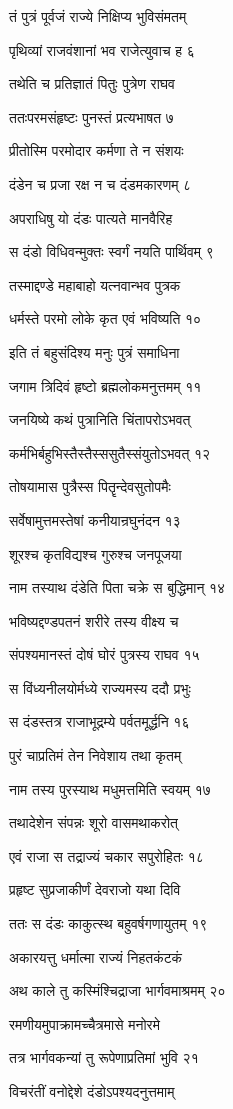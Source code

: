 तं पुत्रं पूर्वजं राज्ये निक्षिप्य भुविसंमतम्

पृथिव्यां राजवंशानां भव राजेत्युवाच ह ६

तथेति च प्रतिज्ञातं पितुः पुत्रेण राघव

ततःपरमसंहृष्टः पुनस्तं प्रत्यभाषत ७

प्रीतोस्मि परमोदार कर्मणा ते न संशयः

दंडेन च प्रजा रक्ष न च दंडमकारणम् ८

अपराधिषु यो दंडः पात्यते मानवैरिह

स दंडो विधिवन्मुक्तः स्वर्गं नयति पार्थिवम् ९

तस्माद्दण्डे महाबाहो यत्नवान्भव पुत्रक

धर्मस्ते परमो लोके कृत एवं भविष्यति १०

इति तं बहुसंदिश्य मनुः पुत्रं समाधिना

जगाम त्रिदिवं हृष्टो ब्रह्मलोकमनुत्तमम् ११

जनयिष्ये कथं पुत्रानिति चिंतापरोऽभवत्

कर्मभिर्बहुभिस्तैस्तैस्ससुतैस्संयुतोऽभवत् १२

तोषयामास पुत्रैस्स पितॄन्देवसुतोपमैः

सर्वेषामुत्तमस्तेषां कनीयान्रघुनंदन १३

शूरश्च कृतविद्यश्च गुरुश्च जनपूजया

नाम तस्याथ दंडेति पिता चक्रे स बुद्धिमान् १४

भविष्यद्दण्डपतनं शरीरे तस्य वीक्ष्य च

संपश्यमानस्तं दोषं घोरं पुत्रस्य राघव १५

स विंध्यनीलयोर्मध्ये राज्यमस्य ददौ प्रभुः

स दंडस्तत्र राजाभूद्रम्ये पर्वतमूर्द्धनि १६

पुरं चाप्रतिमं तेन निवेशाय तथा कृतम्

नाम तस्य पुरस्याथ मधुमत्तमिति स्वयम् १७

तथादेशेन संपन्नः शूरो वासमथाकरोत्

एवं राजा स तद्राज्यं चकार सपुरोहितः १८

प्रहृष्ट सुप्रजाकीर्णं देवराजो यथा दिवि

ततः स दंडः काकुत्स्थ बहुवर्षगणायुतम् १९

अकारयत्तु धर्मात्मा राज्यं निहतकंटकं

अथ काले तु कस्मिंश्चिद्राजा भार्गवमाश्रमम् २०

रमणीयमुपाक्रामच्चैत्रमासे मनोरमे

तत्र भार्गवकन्यां तु रूपेणाप्रतिमां भुवि २१

विचरंतीं वनोद्देशे दंडोऽपश्यदनुत्तमाम्

